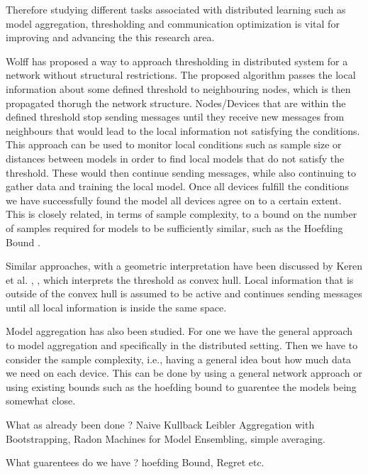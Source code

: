 Therefore studying different tasks associated with distributed learning such as model aggregation, thresholding and communication optimization is vital for improving and advancing the this research area.

Wolff \cite{wolff2013local} has proposed a way to approach thresholding in distributed system for a network without structural restrictions.
The proposed algorithm passes the local information about some defined threshold to neighbouring nodes, which is then propagated thorugh the network structure. Nodes/Devices that are within the defined threshold stop sending messages until they receive new messages from neighbours that would lead to the local information not satisfying the conditions.
This approach can be used to monitor local conditions such as sample size or distances between models in order to find local models that do not satisfy the threshold. These would then continue sending messages, while also continuing to gather data and training the local model. 
Once all devices fulfill the conditions we have successfully found the model all devices agree on to a certain extent. 
This is closely related, in terms of sample complexity, to a bound on the number of samples required for models to be sufficiently similar, such as the Hoefding Bound .

Similar approaches, with a geometric interpretation have been discussed by Keren et al. \cite{sharfman2007geometric}, \cite{keren2011shape}, which interprets the threshold as convex hull. Local information that is outside of the convex hull is assumed to be active and continues sending messages until all local information is inside the same space.

Model aggregation has also been studied.
For one we have the general approach to model aggregation and specifically in the distributed setting.
Then we have to consider the sample complexity, i.e., having a general idea bout how much data we need on each device.
This can be done by using a general network approach or using existing bounds such as the hoefding bound to guarentee the models being somewhat close.

What as already been done ?
Naive Kullback Leibler Aggregation with Bootstrapping, Radon Machines for Model Ensembling, simple averaging.

What guarentees do we have ? 
hoefding Bound, Regret etc.

